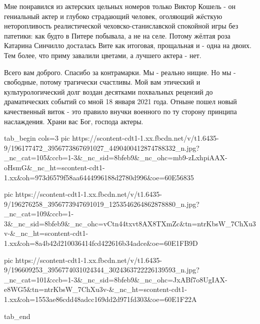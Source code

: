 Мне понравился из актерских цельных номеров только  Виктор Кошель - он
гениальный актер и глубоко страдающий человек, оголяющий жёсткую неторопливость
реалистической чеховско-станиславской спокойной игры без патетики: как будто в
Питере побывала, а не на селе. Потому жёлтая роза Катарина Синчилло  досталась
Вите как итоговая, прощальная и - одна на двоих. Тем более, что приму завалили
цветами, а лучшего актера - нет. 

Всего вам доброго. Спасибо за контрамарки. Мы - реально нищие. Но мы -
свободные, потому трагически счастливы. Мой вам этический и культурологический
долг воздан десятками похвальных рецензий до драматических событий со мной 18
января 2021 года. Отныне пошел новый качественный виток - это правило внучки
военного по ту сторону принципа наслаждения. Храни вас Бог, господа актеры.

\ifcmt
  tab_begin cols=3
     pic https://scontent-cdt1-1.xx.fbcdn.net/v/t1.6435-9/196177472_3956773867691027_4490400412874788332_n.jpg?_nc_cat=105&ccb=1-3&_nc_sid=8bfeb9&_nc_ohc=mb9-zLxhpiAAX-oHsmG&_nc_ht=scontent-cdt1-1.xx&oh=973d6579f58aa6444996188d2780d996&oe=60E56835

     pic https://scontent-cdt1-1.xx.fbcdn.net/v/t1.6435-9/196276258_3956773947691019_1253546264862878880_n.jpg?_nc_cat=109&ccb=1-3&_nc_sid=8bfeb9&_nc_ohc=vCtn44txvt8AX8TXmZc&tn=ntrKbsW_7ChXu3v-&_nc_ht=scontent-cdt1-1.xx&oh=8a4b42d210036414fcd422616b34adce&oe=60E1FB9D

     pic https://scontent-cdt1-1.xx.fbcdn.net/v/t1.6435-9/196609253_3956774031024344_3024363722226139593_n.jpg?_nc_cat=101&ccb=1-3&_nc_sid=8bfeb9&_nc_ohc=JxABf7o8UgIAX-e8WG5&tn=ntrKbsW_7ChXu3v-&_nc_ht=scontent-cdt1-1.xx&oh=1553ae86cdd48adcc169dd2d971fd303&oe=60E1F22A

  tab_end
\fi


